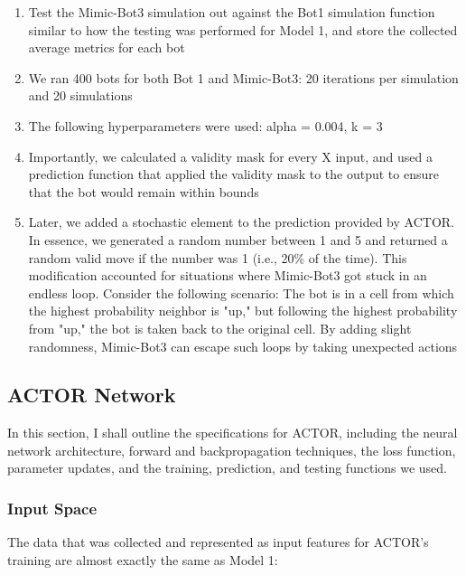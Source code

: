 \documentclass[11pt]{article}
\begin{document}
\begin{enumerate}
\begin{enumerate}
        \item Test the Mimic-Bot3 simulation out against the Bot1 simulation function similar to how the testing was performed for Model 1, and store the collected average metrics for each bot
        \item We ran 400 bots for both Bot 1 and Mimic-Bot3: 20 iterations per simulation and 20 simulations
        \item The following hyperparameters were used: alpha = 0.004, k = 3
        \item Importantly, we calculated a validity mask for every X input, and used a prediction function that applied the validity mask to the output to ensure that the bot would remain within bounds
        \item Later, we added a stochastic element to the prediction provided by ACTOR. In essence, we generated a random number between 1 and 5 and returned a random valid move if the number was 1 (i.e., 20\% of the time). This modification accounted for situations where Mimic-Bot3 got stuck in an endless loop. Consider the following scenario: The bot is in a cell from which the highest probability neighbor is "up," but following the highest probability from "up," the bot is taken back to the original cell. By adding slight randomness, Mimic-Bot3 can escape such loops by taking unexpected actions
    \end{enumerate}
\end{enumerate}

\subsection{ACTOR Network}

In this section, I shall outline the specifications for ACTOR, including the neural network architecture, forward and backpropagation techniques, the loss function, parameter updates, and the training, prediction, and testing functions we used.

\subsubsection{Input Space}

The data that was collected and represented as input features for ACTOR's training are almost exactly the same as Model 1:
\end{document}
